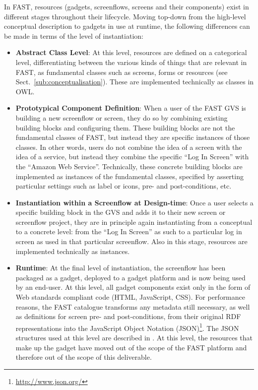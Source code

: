 \documentclass[twoside]{fast_latex}
\begin{document}
In FAST, resources (gadgets, screenflows, screens and their components) exist in different stages throughout their lifecycle. Moving top-down from the high-level conceptual description to gadgets in use at runtime, the following differences can be made in terms of the level of instantiation:

\begin{itemize}
	\item \textbf{Abstract Class Level}: At this level, resources are defined on a categorical level, differentiating between the various kinds of things that are relevant in FAST, as fundamental classes such as screens, forms or resources (see Sect.~\ref{sub:conceptualisation}). These are implemented technically as classes in OWL.
	\item \textbf{Prototypical Component Definition}: When a user of the FAST GVS is building a new screenflow or screen, they do so by combining existing building blocks and configuring them. These building blocks are not the fundamental classes of FAST, but instead they are specific instances of those classes. In other words, users do not combine the idea of a screen with the idea of a service, but instead they combine the specific ``Log In Screen'' with the ``Amazon Web Service''. Technically, these concrete building blocks are implemented as instances of the fundamental classes, specified by asserting particular settings such as label or icons, pre- and post-conditions, etc.
	\item \textbf{Instantiation within a Screenflow at Design-time}: Once a user selects a specific building block in the GVS and adds it to their new screen or screenflow project, they are in principle again instantiating from a conceptual to a concrete level: from the ``Log In Screen'' as such to a particular log in screen as used in that particular screenflow. Also in this stage, resources are implemented technically as instances.
	\item \textbf{Runtime}: At the final level of instantiation, the screenflow has been packaged as a gadget, deployed to a gadget platform and is now being used by an end-user. At this level, all gadget components exist only in the form of Web standards compliant code (HTML, JavaScript, CSS). For performance reasons, the FAST catalogue transforms any metadata still necessary, as well as definitions for screen pre- and post-conditions, from their original RDF representations into the JavaScript Object Notation (JSON)\footnote{\url{http://www.json.org/}}. The JSON structures used at this level are described in \cite{palaghita2010catalogue_manual}. At this level, the resources that make up the gadget have moved out of the scope of the FAST platform and therefore out of the scope of this deliverable.
\end{itemize}
\end{document}
